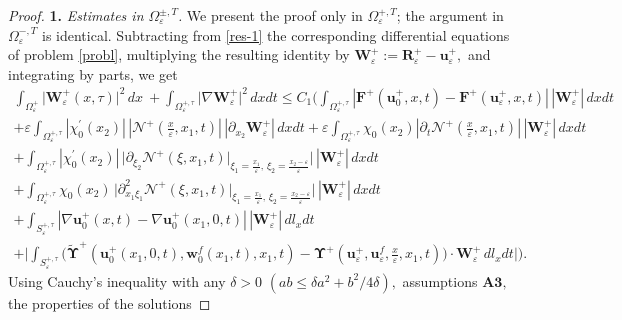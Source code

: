 \documentclass[reqno]{amsart}            %
\numberwithin{equation}{section}
\begin{document}
	\begin{proof}
		\textbf{1.} \emph{Estimates in $\Omega_\varepsilon^{\pm, T}$.}
		We present the proof only in $\Omega_\varepsilon^{+, T}$; the argument in $\Omega_\varepsilon^{-,T}$ is identical.  Subtracting from \eqref{res-1} the corresponding differential equations of problem \eqref{probl},  multiplying the resulting identity by $\mathbf{W}^+_\varepsilon := \mathbf{R}^+_\varepsilon - \mathbf{u}^+_\varepsilon,$ and 
		integrating by parts, we get
		\begin{multline}\label{est-5-10}
			\int_{\Omega_\varepsilon^+} \big|\mathbf{W}^+_\varepsilon(x,\tau)\big|^2 \, dx\  + \int_{\Omega_\varepsilon^{+, \tau}} \big|\nabla \mathbf{W}^+_\varepsilon\big|^2 \, dxdt \le C_1\Bigg(\int_{\Omega_\varepsilon^{+, \tau}} |\mathbf{F}^+(\mathbf{u}_0^+, x, t) - \mathbf{F}^+(\mathbf{u}_\varepsilon^+, x, t)| \,
			|\mathbf{W}^+_\varepsilon|\, dxdt 
			\\
			+ \varepsilon \int_{\Omega_\varepsilon^{+, \tau}} |\chi^\prime_0(x_2)|\, |\boldsymbol{\mathcal{N}}^+(\tfrac{x}{\varepsilon}, x_1, t)|\,
			|\partial_{x_2}\mathbf{W}^+_\varepsilon| \, dxdt
			+ \varepsilon \int_{\Omega_\varepsilon^{+, \tau}} \chi_0(x_2) |\partial_t\boldsymbol{\mathcal{N}}^+(\tfrac{x}{\varepsilon},x_1,t)|
			\, |\mathbf{W}^+_\varepsilon|\, dxdt 
			\\
			+
			\int_{\Omega_\varepsilon^{+, \tau}} |\chi^\prime_0(x_2)| \, \big| \partial_{\xi_2}\boldsymbol{\mathcal{N}}^+(\xi,x_1,t)\big|_{\xi_1=\frac{x_1}{\varepsilon}, \, \xi_2=\frac{x_2 - \varepsilon}{\varepsilon}}\big|
			\, |\mathbf{W}^+_\varepsilon|\, dxdt
			\\
			+ \int_{\Omega_\varepsilon^{+, \tau}} \chi_0(x_2) \, \big|\partial^2_{x_1\xi_1}\boldsymbol{\mathcal{N}}^+(\xi,x_1,t)\big|_{\xi_1=\frac{x_1}{\varepsilon}, \, \xi_2=\frac{x_2 - \varepsilon}{\varepsilon}}\big| \, |\mathbf{W}^+_\varepsilon|\, dxdt
			\\
			+	\int_{S_\varepsilon^{+, \tau}}|\nabla\mathbf{u}_0^+(x,t) -\nabla\mathbf{u}_0^+(x_1,0,t)| \, |\mathbf{W}^+_\varepsilon| \, dl_xdt 
			\\	
			+ \bigg|\int_{S_\varepsilon^{+, \tau}} \big(\widetilde{\boldsymbol{\Upsilon}}^+(\mathbf{u}^+_0(x_1,0,t), \mathbf{w}^f_0(x_1,t), x_1, t) -  \boldsymbol{\Upsilon}^+(\mathbf{u}_\varepsilon^+, \mathbf{u}_\varepsilon^f, \tfrac{x}{\varepsilon}, x_1, t)\big) \cdot \mathbf{W}^+_\varepsilon \, dl_xdt\bigg| \Bigg).
		\end{multline}
		Using Cauchy’s inequality with any $\delta > 0$ $(ab \le \delta a^2 + b^2/4\delta),$ assumptions $\mathbf{A3},$ the properties of the solutions

\end{proof}
\end{document}
